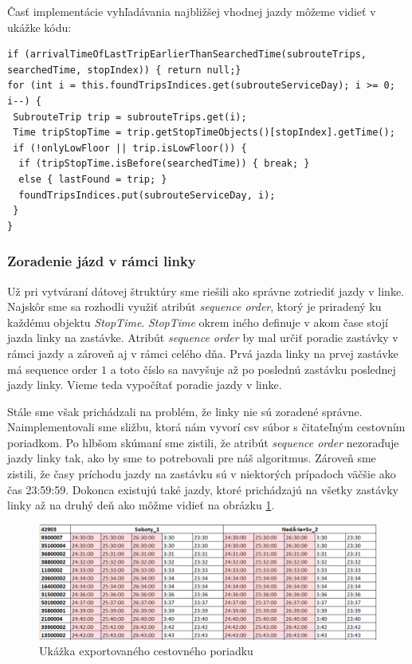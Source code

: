 Časť implementácie vyhľadávania najbližšej vhodnej jazdy môžeme vidieť v ukážke kódu: 
\begin{lstlisting}
if (arrivalTimeOfLastTripEarlierThanSearchedTime(subrouteTrips, searchedTime, stopIndex)) { return null;}
for (int i = this.foundTripsIndices.get(subrouteServiceDay); i >= 0; i--) {
 SubrouteTrip trip = subrouteTrips.get(i);
 Time tripStopTime = trip.getStopTimeObjects()[stopIndex].getTime();
 if (!onlyLowFloor || trip.isLowFloor()) {
  if (tripStopTime.isBefore(searchedTime)) { break; }
  else { lastFound = trip; }
  foundTripsIndices.put(subrouteServiceDay, i);
 }
}
\end{lstlisting}

\subsubsection{Zoradenie jázd v rámci linky}
Už pri vytváraní dátovej štruktúry sme riešili ako správne zotriediť jazdy v linke. Najskôr sme sa rozhodli využiť atribút \textit{sequence order}, ktorý je priradený ku každému objektu \textit{StopTime}. \textit{StopTime} okrem iného definuje v akom čase stojí jazda linky na zastávke. Atribút \textit{sequence order} by mal určiť poradie zastávky v rámci jazdy a zároveň aj v rámci celého dňa. Prvá jazda linky na prvej zastávke má sequence order $1$ a toto číslo sa navyšuje až po poslednú zastávku poslednej jazdy linky. Vieme teda vypočítať poradie jazdy v linke. 

Stále sme však prichádzali na problém, že linky nie sú zoradené správne. Naimplementovali sme sližbu, ktorá nám vyvorí csv súbor s čitateľným cestovním poriadkom. Po hlbšom skúmaní sme zistili, že atribút \textit{sequence order} nezoraďuje jazdy linky tak, ako by sme to potrebovali pre náš algoritmus. Zároveň sme zistili, že časy príchodu jazdy na zastávku sú v niektorých prípadoch väčšie ako čas 23:59:59. Dokonca existujú také jazdy, ktoré prichádzajú na všetky zastávky linky až na druhý deň ako môžme vidieť na obrázku \ref{fig:weird-times}.

\begin{figure}[H]
\centerline{\includegraphics[width=1\textwidth]{images/weird-times}}
\caption[Ukážka exportovaného cestovného poriadku]{Ukážka exportovaného cestovného poriadku}
\label{fig:weird-times}
\end{figure} 

